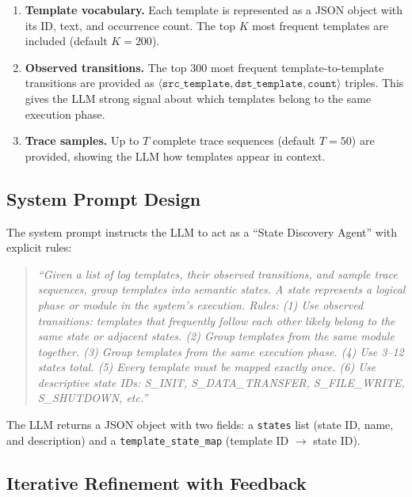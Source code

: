 \documentclass[11pt]{article}
\begin{document}
\begin{enumerate}[leftmargin=*,itemsep=2pt]
    \item \textbf{Template vocabulary.} Each template is represented as a JSON object with its ID, text, and occurrence count. The top $K$ most frequent templates are included (default $K = 200$).
    
    \item \textbf{Observed transitions.} The top 300 most frequent template-to-template transitions are provided as $\langle\texttt{src\_template}, \texttt{dst\_template}, \texttt{count}\rangle$ triples. This gives the LLM strong signal about which templates belong to the same execution phase.
    
    \item \textbf{Trace samples.} Up to $T$ complete trace sequences (default $T = 50$) are provided, showing the LLM how templates appear in context.
\end{enumerate}

\subsection{System Prompt Design}

The system prompt instructs the LLM to act as a ``State Discovery Agent'' with explicit rules:

\begin{quote}
\small
\textit{``Given a list of log templates, their observed transitions, and sample trace sequences, group templates into semantic states. A state represents a logical phase or module in the system's execution. Rules: (1) Use observed transitions: templates that frequently follow each other likely belong to the same state or adjacent states. (2) Group templates from the same module together. (3) Group templates from the same execution phase. (4) Use 3--12 states total. (5) Every template must be mapped exactly once. (6) Use descriptive state IDs: S\_INIT, S\_DATA\_TRANSFER, S\_FILE\_WRITE, S\_SHUTDOWN, etc.''}
\end{quote}

The LLM returns a JSON object with two fields: a \texttt{states} list (state ID, name, and description) and a \texttt{template\_state\_map} (template ID $\rightarrow$ state ID).

\subsection{Iterative Refinement with Feedback}
\end{document}
